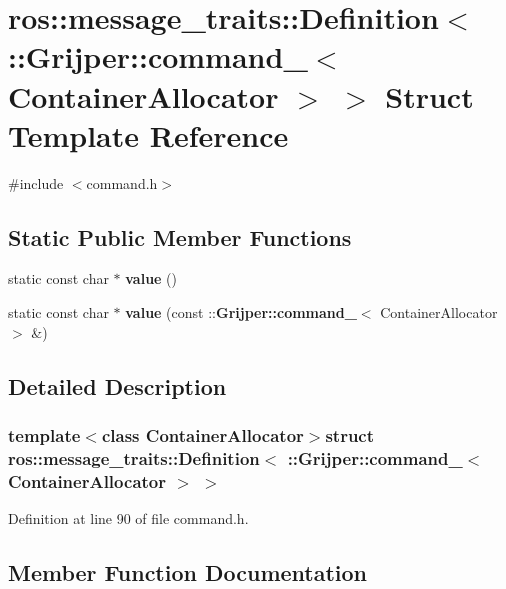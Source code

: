 \section{ros\-:\-:message\-\_\-traits\-:\-:Definition$<$ \-:\-:Grijper\-:\-:command\-\_\-$<$ Container\-Allocator $>$ $>$ Struct Template Reference}
\label{structros_1_1message__traits_1_1Definition_3_01_1_1Grijper_1_1command___3_01ContainerAllocator_01_4_01_4}


{\ttfamily \#include $<$command.\-h$>$}

\subsection*{Static Public Member Functions}
\begin{DoxyCompactItemize}
\item 
static const char $\ast$ {\bf value} ()
\item 
static const char $\ast$ {\bf value} (const \-::{\bf Grijper\-::command\-\_\-}$<$ Container\-Allocator $>$ \&)
\end{DoxyCompactItemize}


\subsection{Detailed Description}
\subsubsection*{template$<$class Container\-Allocator$>$struct ros\-::message\-\_\-traits\-::\-Definition$<$ \-::\-Grijper\-::command\-\_\-$<$ Container\-Allocator $>$ $>$}



Definition at line 90 of file command.\-h.



\subsection{Member Function Documentation}
